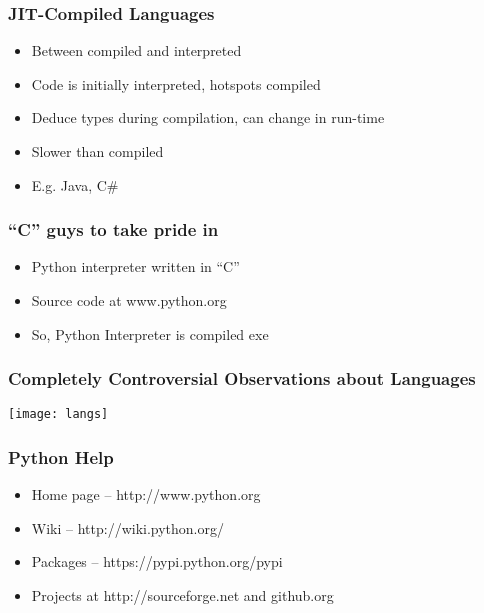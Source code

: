 \begin{frame}[fragile]  \frametitle{JIT-Compiled Languages}
\begin{itemize}
\item Between compiled and interpreted
\item Code is initially interpreted, hotspots compiled
\item Deduce types during compilation, can change in run-time
\item Slower than compiled
\item E.g. Java, C\#
\end{itemize}
\end{frame}

\begin{frame}[fragile]  \frametitle{``C'' guys to take pride in}
\begin{itemize}
\item Python interpreter written in  ``C''
\item Source code at www.python.org
\item So, Python Interpreter is compiled exe
\end{itemize}
\end{frame}


\begin{frame}[fragile]  \frametitle{Completely Controversial Observations about Languages}
\begin{center}
\texttt{[image: langs]}
\end{center}
\end{frame}


\begin{frame}[fragile]  \frametitle{Python Help}
\begin{itemize}
\item Home page -- http://www.python.org
\item Wiki -- http://wiki.python.org/
\item  Packages -- https://pypi.python.org/pypi
\item Projects at http://sourceforge.net and github.org
\end{itemize}
\end{frame}


